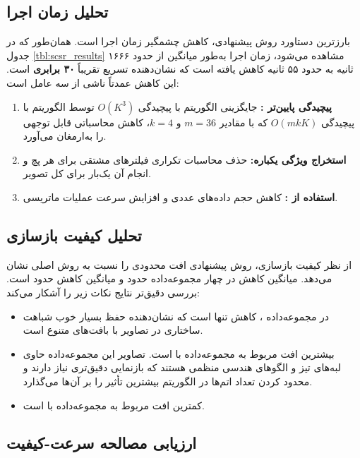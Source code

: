 \subsection{تحلیل زمان اجرا}

بارزترین دستاورد روش پیشنهادی، کاهش چشمگیر زمان اجرا است. همان‌طور که در جدول \ref{tbl:scsr_results} مشاهده می‌شود، زمان اجرا به‌طور میانگین از حدود ۱۶۶۶ ثانیه به حدود ۵۵ ثانیه کاهش یافته است که نشان‌دهنده تسریع تقریباً \textbf{۳۰ برابری} است. این کاهش عمدتاً ناشی از سه عامل است:

\begin{enumerate}
\item \textbf{پیچیدگی پایین‌تر :} جایگزینی الگوریتم  با پیچیدگی $O(K^3)$ توسط الگوریتم  با پیچیدگی $O(mkK)$ که با مقادیر $m = 36$ و $k = 4$، کاهش محاسباتی قابل توجهی را به‌ارمغان می‌آورد.
\item \textbf{استخراج ویژگی یکباره:} حذف محاسبات تکراری فیلترهای مشتقی برای هر پچ و انجام آن یک‌بار برای کل تصویر.
\item \textbf{استفاده از :} کاهش حجم داده‌های عددی و افزایش سرعت عملیات ماتریسی.
\end{enumerate}

\subsection{تحلیل کیفیت بازسازی}

از نظر کیفیت بازسازی، روش پیشنهادی افت محدودی را نسبت به روش اصلی نشان می‌دهد. میانگین کاهش  در چهار مجموعه‌داده حدود  و میانگین کاهش  حدود  است. بررسی دقیق‌تر نتایج نکات زیر را آشکار می‌کند:

\begin{itemize}
\item در مجموعه‌داده ، کاهش  تنها  است که نشان‌دهنده حفظ بسیار خوب شباهت ساختاری در تصاویر با بافت‌های متنوع است.
\item بیشترین افت  مربوط به مجموعه‌داده  با  است. تصاویر این مجموعه‌داده حاوی لبه‌های تیز و الگوهای هندسی منظمی هستند که بازنمایی دقیق‌تری نیاز دارند و محدود کردن تعداد اتم‌ها در الگوریتم  بیشترین تأثیر را بر آن‌ها می‌گذارد.
\item کمترین افت  مربوط به مجموعه‌داده  با  است.
\end{itemize}

\subsection{ارزیابی مصالحه سرعت-کیفیت}

